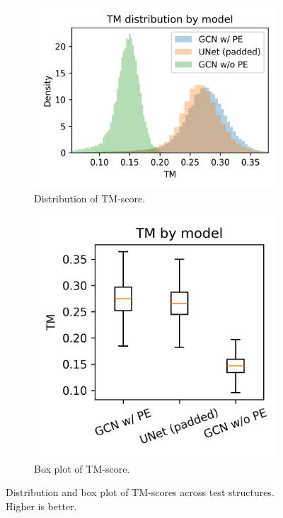 \documentclass[a4paper,12pt]{article}
\begin{document}
\begin{figure}[htbp]
    \centering
    \begin{subfigure}[b]{0.57\textwidth}
        \centering
        \includegraphics[width=\linewidth]{tm_dist.png}
        \caption{Distribution of TM-score.}
        \label{fig:tm-hist}
    \end{subfigure}
    \begin{subfigure}[b]{0.42\textwidth}
        \centering
        \includegraphics[width=\linewidth]{tm_box.png}
        \caption{Box plot of TM-score.}
        \label{fig:tm-box}
    \end{subfigure}
    \caption{Distribution and box plot of TM-scores across test structures. Higher is better.}
    \label{fig:tm-dist-box-plot}
\end{figure}
\end{document}
